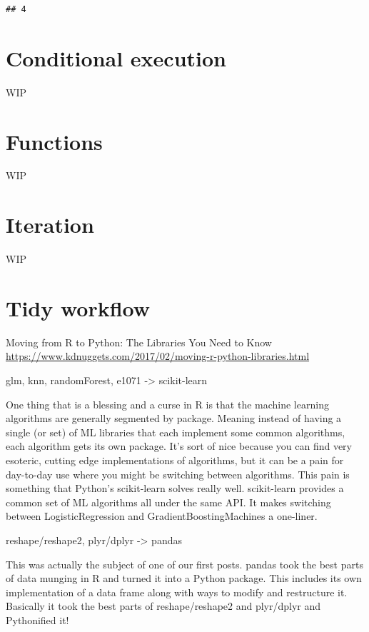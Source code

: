 \documentclass[]{book}
\begin{document}
\begin{verbatim}
## 4
\end{verbatim}

\hypertarget{conditional-execution}{%
\chapter{Conditional execution}\label{conditional-execution}}

WIP

\hypertarget{functions}{%
\chapter{Functions}\label{functions}}

WIP

\hypertarget{iteration}{%
\chapter{Iteration}\label{iteration}}

WIP

\hypertarget{tidy-workflow}{%
\chapter{Tidy workflow}\label{tidy-workflow}}

Moving from R to Python: The Libraries You Need to Know \url{https://www.kdnuggets.com/2017/02/moving-r-python-libraries.html}

glm, knn, randomForest, e1071 -\textgreater{} scikit-learn

One thing that is a blessing and a curse in R is that the machine learning algorithms are generally segmented by package. Meaning instead of having a single (or set) of ML libraries that each implement some common algorithms, each algorithm gets its own package. It's sort of nice because you can find very esoteric, cutting edge implementations of algorithms, but it can be a pain for day-to-day use where you might be switching between algorithms. This pain is something that Python's scikit-learn solves really well. scikit-learn provides a common set of ML algorithms all under the same API. It makes switching between LogisticRegression and GradientBoostingMachines a one-liner.

reshape/reshape2, plyr/dplyr -\textgreater{} pandas

This was actually the subject of one of our first posts. pandas took the best parts of data munging in R and turned it into a Python package. This includes its own implementation of a data frame along with ways to modify and restructure it. Basically it took the best parts of reshape/reshape2 and plyr/dplyr and Pythonified it!
\end{document}
